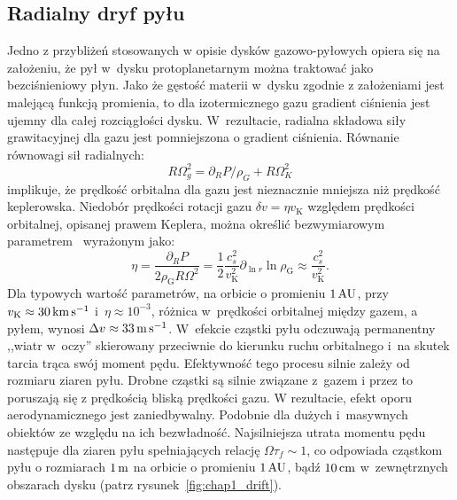 \subsection{Radialny dryf pyłu}
Jedno z przybliżeń stosowanych w opisie dysków gazowo-pyłowych opiera się na
założeniu, że pył w~dysku protoplanetarnym można traktować jako bezciśnieniowy płyn. 
Jako że gęstość materii w~dysku zgodnie z założeniami jest malejącą funkcją
promienia, to dla izotermicznego gazu gradient ciśnienia jest ujemny dla całej
rozciągłości dysku. W~rezultacie, radialna składowa siły grawitacyjnej dla gazu
jest pomniejszona o gradient ciśnienia. Równanie równowagi sił radialnych:
%
\begin{equation}
   R\Omega_g^2 = \partial_R P / \rho_G + R\Omega_K^2
\end{equation}
%
implikuje, że prędkość orbitalna dla gazu jest nieznacznie mniejsza niż prędkość
keplerowska. Niedobór prędkości rotacji gazu $\delta v = \eta v_\textrm{K}$
względem prędkości orbitalnej, opisanej prawem Keplera, można określić 
bezwymiarowym parametrem~\cite{N86} wyrażonym jako:
%
\begin{equation}
   \label{eq:eta}
   \eta = \frac{\partial_R P}{2\rho_\textrm{G} R \Omega^2} = \frac{1}{2}
   \frac{c_s^2}{v_\textrm{K}^2} \partial_{\ln r} \ln \rho_{\textrm{G}} \approx
   \frac{c_s^2}{v_\textrm{K}^2}.
\end{equation}
%
Dla typowych wartość parametrów, na orbicie o promieniu $1\hbox{$\thinspace\textrm{AU}$}$, przy
$v_\textrm{K}\approx 30\hbox{$\thinspace\textrm{km}$}\hbox{$\thinspace\textrm{s}$}^{-1}$ i~$\eta \approx 10^{-3}$, różnica w~prędkości
orbitalnej między gazem, a pyłem, wynosi $\Delta v \approx 33\hbox{$\thinspace\textrm{m}$}\hbox{$\thinspace\textrm{s}$}^{-1}$.
W~efekcie cząstki pyłu odczuwają permanentny ,,wiatr w~oczy'' skierowany
przeciwnie do kierunku ruchu orbitalnego i~na skutek tarcia trąca swój moment
pędu. Efektywność tego procesu silnie zależy od rozmiaru ziaren pyłu. Drobne
cząstki są silnie związane z~gazem i przez to poruszają się z prędkością bliską
prędkości gazu. W rezultacie, efekt oporu aerodynamicznego jest zaniedbywalny.
Podobnie dla dużych i~masywnych obiektów ze względu na ich bezwładność.
Najsilniejsza utrata momentu pędu następuje dla ziaren pyłu spełniających
relację $\Omega \tau_f \sim 1$, co odpowiada cząstkom pyłu o rozmiarach $1\hbox{$\thinspace\textrm{m}$}$ na
orbicie o promieniu $1\hbox{$\thinspace\textrm{AU}$}$, bądź $10\hbox{$\thinspace\textrm{cm}$}$ w~zewnętrznych obszarach dysku (patrz
rysunek~\ref{fig:chap1_drift}).
%

